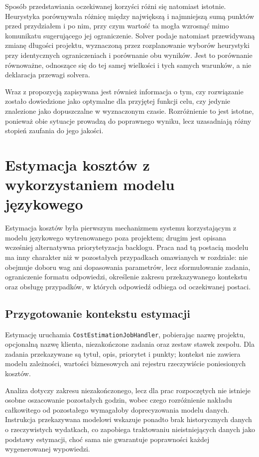 Sposób przedstawiania oczekiwanej korzyści różni się natomiast istotnie. Heurystyka porównywała różnicę między największą i najmniejszą sumą punktów przed przydziałem i po nim, przy czym wartość ta mogła wzrosnąć mimo komunikatu sugerującego jej ograniczenie. Solver podaje natomiast przewidywaną zmianę długości projektu, wyznaczoną przez rozplanowanie wyborów heurystyki przy identycznych ograniczeniach i porównanie obu wyników. Jest to porównanie równoważne, odnoszące się do tej samej wielkości i tych samych warunków, a nie deklaracja przewagi solvera.

Wraz z propozycją zapisywana jest również informacja o tym, czy rozwiązanie zostało dowiedzione jako optymalne dla przyjętej funkcji celu, czy jedynie znalezione jako dopuszczalne w wyznaczonym czasie. Rozróżnienie to jest istotne, ponieważ obie sytuacje prowadzą do poprawnego wyniku, lecz uzasadniają różny stopień zaufania do jego jakości.

\section{Estymacja kosztów z wykorzystaniem modelu językowego}
\label{sec:estymacja-llm-praca-nad-modelem}

Estymacja kosztów była pierwszym mechanizmem systemu korzystającym z modelu językowego wytrenowanego poza projektem; drugim jest opisana wcześniej alternatywna priorytetyzacja backlogu. Praca nad tą postacią modelu ma inny charakter niż w pozostałych przypadkach omawianych w rozdziale: nie obejmuje doboru wag ani dopasowania parametrów, lecz sformułowanie zadania, ograniczenie formatu odpowiedzi, określenie zakresu przekazywanego kontekstu oraz obsługę przypadków, w których odpowiedź odbiega od oczekiwanej postaci.

\subsection{Przygotowanie kontekstu estymacji}

Estymację uruchamia \texttt{CostEstimationJobHandler}, pobierając nazwę projektu, opcjonalną nazwę klienta, niezakończone zadania oraz zestaw stawek zespołu. Dla zadania przekazywane są tytuł, opis, priorytet i punkty; kontekst nie zawiera modelu zależności, wartości biznesowych ani rejestru rzeczywiście poniesionych kosztów.

Analiza dotyczy zakresu niezakończonego, lecz dla prac rozpoczętych nie istnieje osobne oszacowanie pozostałych godzin, wobec czego rozróżnienie nakładu całkowitego od pozostałego wymagałoby doprecyzowania modelu danych. Instrukcja przekazywana modelowi wskazuje ponadto brak historycznych danych o rzeczywistych wydatkach, co zapobiega traktowaniu nieistniejących danych jako podstawy estymacji, choć sama nie gwarantuje poprawności każdej wygenerowanej wypowiedzi.

